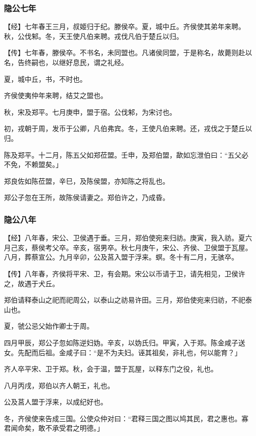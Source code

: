 \documentclass[]{article}
\begin{document}
\hypertarget{header-n91}{%
\subsubsection{隐公七年 }\label{header-n91}}

【经】七年春王三月，叔姬归于纪。滕侯卒。夏，城中丘。齐侯使其弟年来聘。秋，公伐邾。冬，天王使凡伯来聘。戎伐凡伯于楚丘以归。

【传】七年春，滕侯卒。不书名，未同盟也。凡诸侯同盟，于是称名，故薨则赴以名，告终嗣也，以继好息民，谓之礼经。

夏，城中丘，书，不时也。

齐侯使夷仲年来聘，结艾之盟也。

秋，宋及郑平。七月庚申，盟于宿。公伐邾，为宋讨也。

初，戎朝于周，发币于公卿，凡伯弗宾。冬，王使凡伯来聘。还，戎伐之于楚丘以归。

陈及郑平。十二月，陈五父如郑莅盟。壬申，及郑伯盟，歃如忘泄伯曰：``五父必不免，不赖盟矣。」

郑良佐如陈莅盟，辛巳，及陈侯盟，亦知陈之将乱也。

郑公子忽在王所，故陈侯请妻之。郑伯许之，乃成昏。

\hypertarget{header-n103}{%
\subsubsection{隐公八年 }\label{header-n103}}

【经】八年春，宋公、卫侯遇于垂。三月，郑伯使宛来归祊。庚寅，我入祊。夏六月己亥，蔡侯考父卒。辛亥，宿男卒。秋七月庚午，宋公、齐侯、卫侯盟于瓦屋。八月，葬蔡宣公。九月辛卯，公及莒入盟于浮来。螟。冬十有二月，无骇卒。

【传】八年春，齐侯将平宋、卫，有会期。宋公以币请于卫，请先相见，卫侯许之，故遇于犬丘。

郑伯请释泰山之祀而祀周公，以泰山之祊易许田。三月，郑伯使宛来归祊，不祀泰山也。

夏，虢公忌父始作卿士于周。

四月甲辰，郑公子忽如陈逆妇妫。辛亥，以妫氏归。甲寅，入于郑。陈金咸子送女。先配而后祖。金咸子曰：``是不为夫妇。诬其祖矣，非礼也，何以能育？」

齐人卒平宋、卫于郑。秋，会于温，盟于瓦屋，以释东门之役，礼也。

八月丙戌，郑伯以齐人朝王，礼也。

公及莒人盟于浮来，以成纪好也。

冬，齐侯使来告成三国。公使众仲对曰：``君释三国之图以鸠其民，君之惠也。寡君闻命矣，敢不承受君之明德。」
\end{document}
